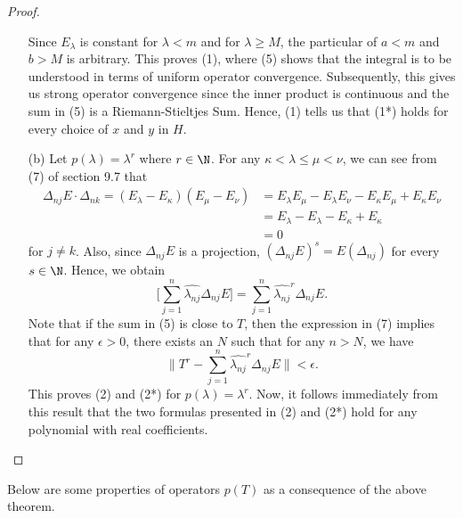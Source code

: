 \begin{proof}
\begin{enumerate}
        
        Since \( {E}_{\lambda} \) is constant for \( \lambda < m  \) and for \( \lambda \geq M  \), the particular of \( a < m  \) and \( b > M  \) is arbitrary. This proves (1), where (5) shows that the integral is to be understood in terms of uniform operator convergence. Subsequently, this gives us strong operator convergence  since the inner product is continuous and the sum in (5) is a Riemann-Stieltjes Sum. Hence, (1) tells us that (1*) holds for every choice of \( x  \) and \( y  \) in \( H  \).
    \item[(b)] Let \( p(\lambda) = \lambda^{r} \) where \( r \in \N \). For any \( \kappa < \lambda \leq \mu < \nu \), we can see from (7) of section 9.7 that 
        \begin{align*}
            \Delta_{nj} E  \cdot \Delta_{nk} =   ({E}_{\lambda} - {E}_{\kappa} ) ({E}_{\mu} - {E}_{\nu}) &= {E}_{\lambda} {E}_{\mu} - {E}_{\lambda } {E}_{\nu} - {E}_{\kappa} {E}_{\mu} + {E}_{\kappa} {E}_{\nu} \\
                                                                                                         &= {E}_{\lambda} - {E}_{\lambda} - {E}_{\kappa} + {E}_{\kappa} \\
                                                                                                         &= 0
        \end{align*}
        for \( j \neq k  \). Also, since \( {\Delta}_{nj} E  \) is a projection, \( (\Delta_{nj} E )^{s} = E (\Delta_{nj}) \) for every \( s \in \N  \). Hence, we obtain
        \[  \Big[ \sum_{ j=1  }^{ n } \hat{{\lambda}_{nj}} \Delta_{nj} E \Big] = \sum_{ j=1  }^{ n } \hat{{\lambda}_{nj}}^{r} \Delta_{nj} E.  \tag{7} \]
        Note that if the sum in (5) is close to \( T  \), then the expression in (7) implies that for any \( \epsilon > 0  \), there exists an \( N  \) such that for any \( n > N  \), we have 
        \[  \Big\|T^{r} - \sum_{ j=1  }^{ n } \hat{{\lambda}_{nj}}^{r}  \Delta_{nj} E \Big\| < \epsilon. \]
        This proves (2) and (2*) for \( p(\lambda) = \lambda^{r} \). Now, it follows immediately from this result that the two formulas presented in (2) and (2*) hold for any polynomial with real coefficients.
\end{enumerate}
\end{proof}

Below are some properties of operators \( p(T) \) as a consequence of the above theorem.

